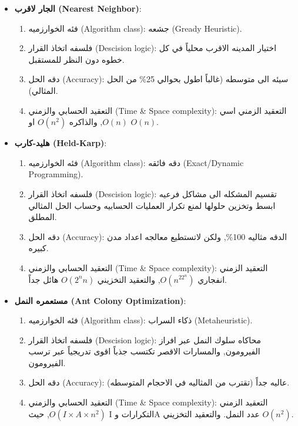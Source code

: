 \documentclass{article}
\newcommand{\en}[1]{\textenglish{#1}}
\begin{document}
\begin{itemize}
	\item \textbf{الجار لاقرب (\en{Nearest Neighbor})}:
		\begin{enumerate}
			\item فئه الخوارزميه (\en{Algorithm class}):
جشعه (\en{Gready Heuristic}).
			\item فلسفه اتخاذ القرار  (\en{Descision logic}):
اختيار المدينه الاقرب محلياً في كل خطوه دون النظر للمستقبل.
			\item دقه الحل (\en{Accuracy}):
سيئه الى متوسطه (غالباً اطول بحوالي 25\% من الحل المثالي).
			\item التعقيد الحسابي والزمني (\en{Time \& Space complexity}):
التعقيد الزمني اسي $O(n)$, والذاكره $O(n^2)$ او $O(n)$.
		\end{enumerate}

	\item \textbf{هليد-كارب (\en{Held-Karp})}:
		\begin{enumerate}
			\item فئه الخوارزميه (\en{Algorithm class}):
دقه فائقه (\en{Exact/Dynamic Programming}).
			\item فلسفه اتخاذ القرار  (\en{Descision logic}):
تقسيم المشكله الى مشاكل فرعيه ابسط وتخزين حلولها لمنع تكرار العمليات الحسابيه وحساب الحل المثالي المطلق.
			\item دقه الحل (\en{Accuracy}):
الدقه مثاليه 100\%, ولكن لاتستطيع معالجه اعداد مدن كبيره.
			\item التعقيد الحسابي والزمني (\en{Time \& Space complexity}):
التعقيد الزمني انفجاري $O(n^22^n)$, والتعقيد التخزيني $O(2^nn)$ هائل جداً.
		\end{enumerate}

	\item \textbf{مستعمره النمل (\en{Ant Colony Optimization})}:
		\begin{enumerate}
			\item فئه الخوارزميه (\en{Algorithm class}):
ذكاء السراب (\en{Metaheuristic}).
			\item فلسفه اتخاذ القرار  (\en{Descision logic}):
محاكاه سلوك النمل عبر افراز الفيرومون, والمسارات الاقصر تكتسب جذباً اقوى تدريجياً عبر ترسب الفيرومون.
			\item دقه الحل (\en{Accuracy}):
عاليه جداً (تقترب من المثاليه في الاحجام المتوسطه).
			\item التعقيد الحسابي والزمني (\en{Time \& Space complexity}):
التعقيد الزمني $O(I \times A \times n^2)$, حيث \en{I} التكرارات و\en{A} عدد النمل. والتعقيد التخزيني $O(n^2)$.
		\end{enumerate}


\end{itemize}
\end{document}
